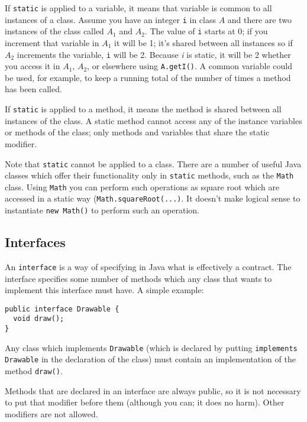 If \texttt{static} is applied to a variable, it means that variable is common to all instances of a class. Assume you have an integer \texttt{i} in class $A$ and there are two instances of the class called $A_{1}$ and $A_{2}$. The value of \texttt{i} starts at 0; if you increment that variable in $A_{1}$ it will be 1; it's shared between all instances so if $A_{2}$ increments the variable, \texttt{i} will be 2. Because \textit{i} is static, it will be 2 whether you access it in $A_{1}$, $A_{2}$, or elsewhere using \texttt{A.getI()}. A common variable could be used, for example, to keep a running total of the number of times a method has been called.

If \texttt{static} is applied to a method, it means the method is shared between all instances of the class. A static method cannot access any of the instance variables or methods of the class; only methods and variables that share the static modifier.

Note that \texttt{static} cannot be applied to a class. There are a number of useful Java classes which offer their functionality only in \texttt{static} methods, such as the \texttt{Math} class. Using \texttt{Math} you can perform such operations as square root which are accessed in a static way (\texttt{Math.squareRoot(...)}. It doesn't make logical sense to instantiate \texttt{new Math()} to perform such an operation. 

\subsection*{Interfaces}

An \texttt{interface} is a way of specifying in Java what is effectively a contract. The interface specifies some number of methods which any class that wants to implement this interface must have. A simple example:

\begin{verbatim}
public interface Drawable {
  void draw();
}
\end{verbatim}

Any class which implements \texttt{Drawable} (which is declared by putting \texttt{implements Drawable} in the declaration of the class) must contain an implementation of the method \texttt{draw()}.

Methods that are declared in an interface are always public, so it is not necessary to put that modifier before them (although you can; it does no harm). Other modifiers are not allowed.

